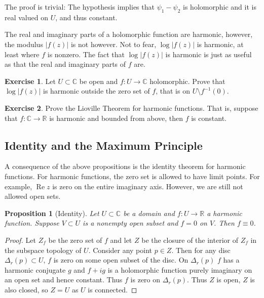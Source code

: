 \documentclass[12pt,openany]{book}
\renewcommand{\Re}{\operatorname{Re}}
\newcommand{\sabs}[1]{\lvert {#1} \rvert}
\newcommand{\C}{{\mathbb{C}}}
\newcommand{\R}{{\mathbb{R}}}
\theoremstyle{plain}
\newtheorem{prop}[thm]{Proposition}
\theoremstyle{remark}
\theoremstyle{definition}
\newenvironment{exbox}{%
    \def\FrameCommand{\vrule width 1pt \relax\hspace {10pt}}%
    \MakeFramed {\advance \hsize -\width \FrameRestore }%
}{%
    \endMakeFramed
}
\theoremstyle{exercise}
\newtheorem{exercise}{Exercise}[section]
\theoremstyle{example}
\begin{document}
The proof is trivial: The hypothesis implies that $\psi_1-\psi_2$ is
holomorphic and it is real valued on $U$, and thus constant.

The real and imaginary parts of a holomorphic function are harmonic,
however, the modulus $\sabs{f(z)}$ is not however.  Not to fear,
$\log \sabs{f(z)}$ is harmonic, at least where $f$ is nonzero.
The fact that $\log \sabs{f(z)}$ is harmonic is just as useful
as that the real and imaginary parts of $f$ are.

\begin{exbox}
\begin{exercise}
Let $U \subset \C$ be open and
$f \colon U \to \C$ holomorphic.  Prove that $\log \sabs{f(z)}$ is harmonic
outside the zero set of $f$, that is on $U \setminus f^{-1}(0)$.
\end{exercise}

\begin{exercise}
Prove the Lioville Theorem for
harmonic functions.  That is, suppose that $f \colon \C \to \R$ is harmonic
and bounded from above, then $f$ is constant.
\end{exercise}
\end{exbox}



\subsection{Identity and the Maximum Principle}

A consequence of the above propositions is the identity theorem
for harmonic functions.  For harmonic functions, the zero set is allowed to
have limit points. For example, $\Re z$ is zero on the entire imaginary
axis.  However, we are still not allowed open sets.

\begin{prop}[Identity]
Let $U \subset \C$ be a domain and $f \colon U \to \R$ a harmonic function.
Suppose $V \subset U$ is a nonempty open subset and $f = 0$ on $V$.  Then $f
\equiv 0$.
\end{prop}

\begin{proof}
Let $Z_f$ be the zero set of $f$ and let $Z$ be the closure of the interior
of $Z_f$ in the subspace topology of $U$.
Consider any point $p \in Z$.  Then for any disc $\Delta_r(p) \subset U$, $f$ is
zero on some open subset of the disc.  On $\Delta_r(p)$ $f$ has a harmonic
conjugate $g$ and $f+i g$ is a holomorphic function purely imaginary on an
open set and hence constant.  Thus $f$ is zero on $\Delta_r(p)$.  Thus $Z$
is open, $Z$ is also closed, so $Z=U$ as $U$ is connected.
\end{proof}
\end{document}

